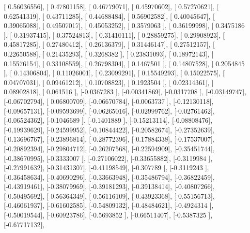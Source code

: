 \documentclass{article}
\begin{document}
       [ 0.56036556],
       [ 0.47801158],
       [ 0.46779071],
       [ 0.45970602],
       [ 0.57270621],
       [ 0.62541319],
       [ 0.43711285],
       [ 0.44688484],
       [ 0.56902582],
       [ 0.40045647],
       [ 0.39065088],
       [ 0.49507017],
       [ 0.45053252],
       [ 0.3579063 ],
       [ 0.36199998],
       [ 0.3475186 ],
       [ 0.31937415],
       [ 0.37524813],
       [ 0.31410111],
       [ 0.28859275],
       [ 0.29908923],
       [ 0.45817285],
       [ 0.27480412],
       [ 0.26136379],
       [ 0.31446147],
       [ 0.27512157],
       [ 0.22650588],
       [ 0.21435293],
       [ 0.3268382 ],
       [ 0.23831093],
       [ 0.18972143],
       [ 0.15576154],
       [ 0.33108559],
       [ 0.26798304],
       [ 0.1467501 ],
       [ 0.14807528],
       [ 0.2054845 ],
       [ 0.14306804],
       [ 0.11026001],
       [ 0.23099291],
       [ 0.15549293],
       [ 0.15022575],
       [ 0.04707031],
       [ 0.09461212],
       [ 0.10708823],
       [ 0.1923504 ],
       [ 0.02314361],
       [ 0.08902818],
       [ 0.061516  ],
       [-0.0367283 ],
       [-0.00341869],
       [-0.0317708 ],
       [-0.03149747],
       [-0.06702794],
       [ 0.06800709],
       [-0.06670784],
       [-0.0063737 ],
       [-0.12130118],
       [-0.09657131],
       [-0.09593699],
       [-0.06265016],
       [-0.02999762],
       [-0.02761462],
       [-0.06524362],
       [-0.1046689 ],
       [-0.1401889 ],
       [-0.15213114],
       [-0.08808476],
       [-0.19939629],
       [-0.24599952],
       [-0.10844422],
       [-0.20582674],
       [-0.27352639],
       [-0.13696767],
       [-0.23896814],
       [-0.28772396],
       [-0.17884338],
       [-0.17537007],
       [-0.20892394],
       [-0.29804712],
       [-0.26207568],
       [-0.22594909],
       [-0.35451744],
       [-0.38670995],
       [-0.3333007 ],
       [-0.27106022],
       [-0.33655882],
       [-0.3119984 ],
       [-0.27991632],
       [-0.31431307],
       [-0.41198549],
       [-0.307789  ],
       [-0.3119243 ],
       [-0.36458634],
       [-0.40690296],
       [-0.33663948],
       [-0.35486794],
       [-0.36822459],
       [-0.43919461],
       [-0.38079969],
       [-0.39181293],
       [-0.39138414],
       [-0.40807266],
       [-0.50495692],
       [-0.56364349],
       [-0.56116109],
       [-0.43923368],
       [-0.55156713],
       [-0.46061937],
       [-0.61602585],
       [-0.54809132],
       [-0.48484621],
       [-0.4924314 ],
       [-0.50019544],
       [-0.60923786],
       [-0.5693852 ],
       [-0.66511407],
       [-0.5387325 ],
       [-0.67717132],
\end{document}
